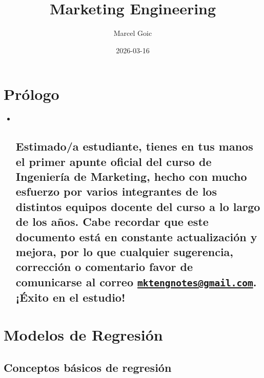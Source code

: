 \documentclass[
]{book}
\title{Marketing Engineering}
\author{Marcel Goic}
\date{2026-03-16}
\begin{document}
\maketitle

{
\setcounter{tocdepth}{1}
\tableofcontents
}
\chapter*{Prólogo}\label{pruxf3logo}

\begin{itemize}
\item ~
  \section{\texorpdfstring{Estimado/a estudiante, tienes en tus manos el primer apunte oficial del curso de Ingeniería de Marketing, hecho con mucho esfuerzo por varios integrantes de los distintos equipos docente del curso a lo largo de los años. Cabe recordar que este documento está en constante actualización y mejora, por lo que cualquier sugerencia, corrección o comentario favor de comunicarse al correo \href{mailto:mktengnotes@gmail.com}{\nolinkurl{mktengnotes@gmail.com}}. ¡Éxito en el estudio!}{Estimado/a estudiante, tienes en tus manos el primer apunte oficial del curso de Ingeniería de Marketing, hecho con mucho esfuerzo por varios integrantes de los distintos equipos docente del curso a lo largo de los años. Cabe recordar que este documento está en constante actualización y mejora, por lo que cualquier sugerencia, corrección o comentario favor de comunicarse al correo mktengnotes@gmail.com. ¡Éxito en el estudio!}}\label{estimadoa-estudiante-tienes-en-tus-manos-el-primer-apunte-oficial-del-curso-de-ingenieruxeda-de-marketing-hecho-con-mucho-esfuerzo-por-varios-integrantes-de-los-distintos-equipos-docente-del-curso-a-lo-largo-de-los-auxf1os.-cabe-recordar-que-este-documento-estuxe1-en-constante-actualizaciuxf3n-y-mejora-por-lo-que-cualquier-sugerencia-correcciuxf3n-o-comentario-favor-de-comunicarse-al-correo-mktengnotesgmail.com.-uxe9xito-en-el-estudio}
\end{itemize}

\chapter{Modelos de Regresión}\label{modelos-de-regresiuxf3n}

\section{Conceptos básicos de regresión}\label{conceptos-buxe1sicos-de-regresiuxf3n}
\end{document}
